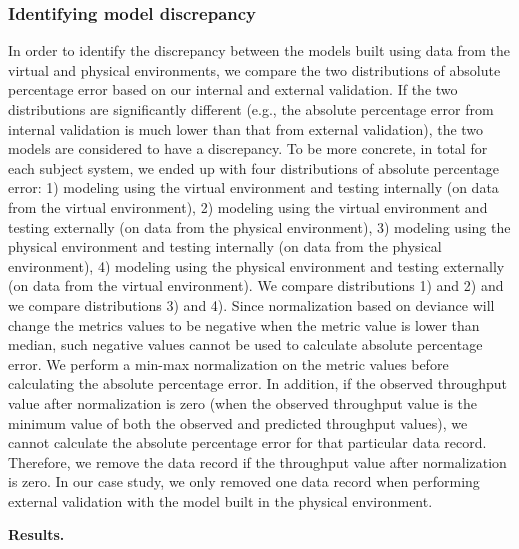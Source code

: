 \subsubsection{Identifying model discrepancy}
In order to identify the discrepancy between the models built using data from the virtual and physical environments, we compare the two distributions of absolute percentage error based on our internal and external validation. If the two distributions are significantly different (e.g., the absolute percentage error from internal validation is much lower than that from external validation), the two models are considered to have a discrepancy. To be more concrete, in total for each subject system, we ended up with four distributions of absolute percentage error: 1) modeling using the virtual environment and testing internally (on data from the virtual environment), 2) modeling using the virtual environment and testing externally (on data from the physical environment), 3) modeling using the physical environment and testing internally (on data from the physical environment), 4) modeling using the physical environment and testing externally (on data from the virtual environment). We compare distributions 1) and 2) and we compare distributions 3) and 4). Since normalization based on deviance will change the metrics values to be negative when the metric value is lower than median, such negative values cannot be used to calculate absolute percentage error. We perform a min-max normalization on the metric values before calculating the absolute percentage error. In addition, if the observed throughput value after normalization is zero (when the observed throughput value is the minimum value of both the observed and predicted throughput values), we cannot calculate the absolute percentage error for that particular data record. Therefore, we remove the data record if the throughput value after normalization is zero. In our case study, we only removed one data record when performing external validation with the model built in the physical environment. 


\noindent \textbf{Results.}

